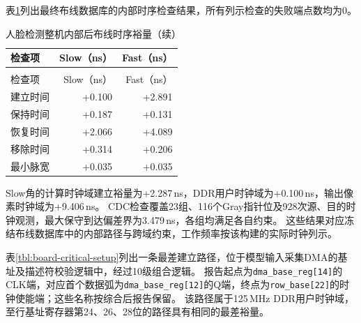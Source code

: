 表\ref{tbl:face-board-timing}列出最终布线数据库的内部时序检查结果，所有列示检查的失败端点数均为0。

\begin{reporttable}
\begin{longtable}{@{}lrr@{}}
\caption{人脸检测整机内部后布线时序裕量}\label{tbl:face-board-timing}\\
\toprule
检查项 & Slow（ns） & Fast（ns） \\
\midrule
\endfirsthead
\caption[]{人脸检测整机内部后布线时序裕量（续）}\\
\toprule
检查项 & Slow（ns） & Fast（ns） \\
\midrule
\endhead
\bottomrule
\endfoot
建立时间 & +0.100 & +2.891 \\
保持时间 & +0.187 & +0.131 \\
恢复时间 & +2.066 & +4.089 \\
移除时间 & +0.314 & +0.206 \\
最小脉宽 & +0.035 & +0.035 \\
\end{longtable}
\end{reporttable}

Slow角的计算时钟域建立裕量为+2.287\,ns，DDR用户时钟域为+0.100\,ns，输出像素时钟域为+9.406\,ns。
CDC检查覆盖23组、116个Gray指针位及928次源、目的时钟观测，最大保守到达偏差界为3.479\,ns，各组均满足各自约束。
这些结果对应冻结布线数据库中的内部路径与跨域约束，工作频率按该构建的实际时钟列示。

表\ref{tbl:board-critical-setup}列出一条最差建立路径，位于模型输入采集DMA的基址及描述符校验逻辑中，经过10级组合逻辑。
报告起点为\texttt{dma\_\allowbreak base\_\allowbreak reg[14]}的CLK端，对应首个数据弧为\texttt{dma\_\allowbreak base\_\allowbreak reg[12]}的Q端，终点为\texttt{row\_\allowbreak base[22]}的时钟使能端；这些名称按综合后报告保留。
该路径属于125\,MHz DDR用户时钟域，至行基址寄存器第24、26、28位的路径具有相同的最差裕量。

